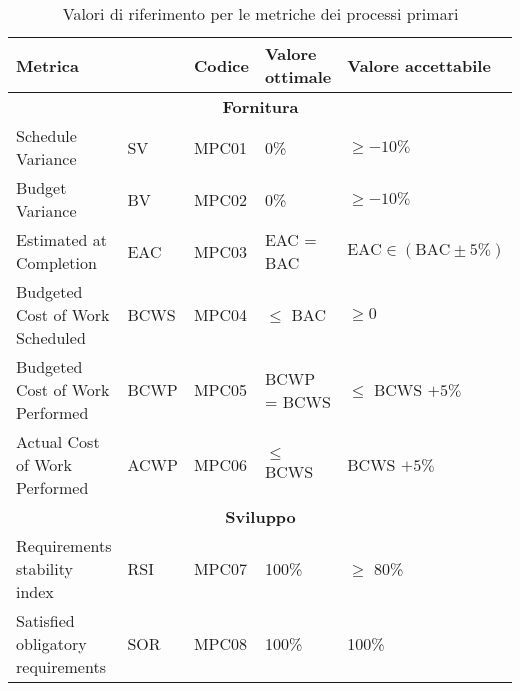 \begin{table}[H]
	\centering
	\begin{tabularx}{\textwidth}{p{3.5cm}|X|X|l|l}
		\hline
		\multicolumn{2}{l|}{\textbf{Metrica}} & \textbf{Codice} & \textbf{Valore ottimale} & \textbf{Valore accettabile}                                         \\
		\hline
		\multicolumn{5}{c}{\textbf{Fornitura}}                                                                                                                   \\
		\hline
		Schedule Variance                     & SV              & MPC01                    & 0\%                         & $\ge -10\%$                           \\
		Budget Variance                       & BV              & MPC02                    & 0\%                         & $\ge -10\%$                           \\
		Estimated at Completion               & EAC             & MPC03                    & EAC = BAC                   & $\text{EAC} \in (\text{BAC} \pm 5\%)$ \\
		Budgeted Cost of Work Scheduled       & BCWS            & MPC04                    & $\le$ BAC                   & $\ge 0$                               \\
		Budgeted Cost of Work Performed       & BCWP            & MPC05                    & BCWP = BCWS                 & $\le$ BCWS $+ 5\%$                    \\
		Actual Cost of Work Performed         & ACWP            & MPC06                    & $\le$ BCWS                  & BCWS $+ 5\%$                          \\
		\hline
		\multicolumn{5}{c}{\textbf{Sviluppo}}                                                                                                                    \\
		\hline
		Requirements stability index          & RSI             & MPC07                    & 100\%                       & $\ge$ 80\%                            \\
		Satisfied obligatory requirements     & SOR             & MPC08                    & 100\%                       & 100\%                                 \\
		\hline
	\end{tabularx}
	\caption{Valori di riferimento per le metriche dei processi primari}
\end{table}


